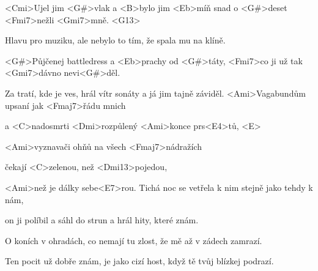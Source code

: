
\zs
<Cmi>Ujel jim <G#>vlak a <B>bylo jim <Eb>míň snad o <G#>deset <Fmi7>nežli <Gmi7>mně. <G13>

Hlavu pro muziku, ale nebylo to tím, že spala mu na klíně.

<G#>Půjčenej battledress a <Eb>prachy od <G#>táty, <Fmi7>co ji už tak <Gmi7>dávno nevi<G#>děl.

Za tratí, kde je ves, hrál vítr sonáty a já jim tajně záviděl.
\ks
\zr
<Ami>Vagabundům upsaní jak <Fmaj7>řádu mnich

a <C>nadosmrti <Dmi>rozpůlený <Ami>konce prs<E4>tů, <E>


<Ami>vyznavači ohňů na všech <Fmaj7>nádražích

čekají <C>zelenou, než <Dmi13>pojedou,

<Ami>než je dálky sebe<E7>rou.
\kr
\zs
Tichá noc se vetřela k nim stejně jako tehdy k nám,

on ji políbil a sáhl do strun a hrál hity, které znám.

O koních v ohradách, co nemají tu zlost, že mě až v zádech zamrazí.

Ten pocit už dobře znám, je jako cizí host, když tě tvůj blízkej podrazí.
\ks
\zr
\kr
\kp
